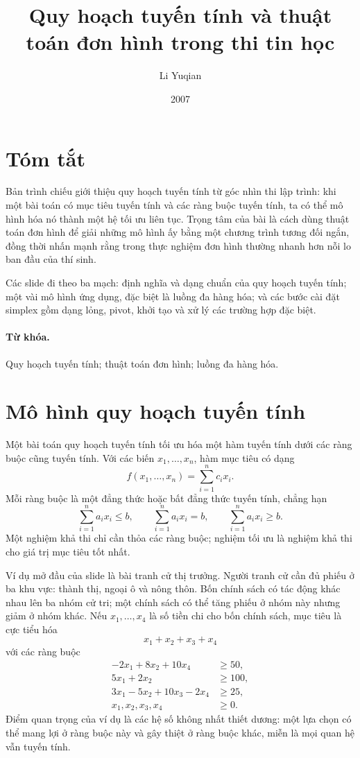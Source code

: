 \documentclass[11pt]{article}
\title{Quy hoạch tuyến tính và thuật toán đơn hình trong thi tin học}
\author{Li Yuqian}
\date{2007}
\begin{document}
\maketitle


\section*{Tóm tắt}

Bản trình chiếu giới thiệu quy hoạch tuyến tính từ góc nhìn thi lập trình:
khi một bài toán có mục tiêu tuyến tính và các ràng buộc tuyến tính, ta có
thể mô hình hóa nó thành một hệ tối ưu liên tục. Trọng tâm của bài là cách
dùng thuật toán đơn hình để giải những mô hình ấy bằng một chương trình tương
đối ngắn, đồng thời nhấn mạnh rằng trong thực nghiệm đơn hình thường nhanh
hơn nỗi lo ban đầu của thí sinh.

Các slide đi theo ba mạch: định nghĩa và dạng chuẩn của quy hoạch tuyến tính;
một vài mô hình ứng dụng, đặc biệt là luồng đa hàng hóa; và các bước cài đặt
simplex gồm dạng lỏng, pivot, khởi tạo và xử lý các trường hợp đặc biệt.

\paragraph{Từ khóa.}
Quy hoạch tuyến tính; thuật toán đơn hình; luồng đa hàng hóa.

\section{Mô hình quy hoạch tuyến tính}

Một bài toán quy hoạch tuyến tính tối ưu hóa một hàm tuyến tính dưới các
ràng buộc cũng tuyến tính. Với các biến \(x_1,\ldots,x_n\), hàm mục tiêu có
dạng
\[
  f(x_1,\ldots,x_n)=\sum_{i=1}^{n} c_ix_i.
\]
Mỗi ràng buộc là một đẳng thức hoặc bất đẳng thức tuyến tính, chẳng hạn
\[
  \sum_{i=1}^{n} a_ix_i\le b,\qquad
  \sum_{i=1}^{n} a_ix_i=b,\qquad
  \sum_{i=1}^{n} a_ix_i\ge b.
\]
Một nghiệm khả thi chỉ cần thỏa các ràng buộc; nghiệm tối ưu là nghiệm khả
thi cho giá trị mục tiêu tốt nhất.

Ví dụ mở đầu của slide là bài tranh cử thị trưởng. Người tranh cử cần đủ
phiếu ở ba khu vực: thành thị, ngoại ô và nông thôn. Bốn chính sách có tác
động khác nhau lên ba nhóm cử tri; một chính sách có thể tăng phiếu ở nhóm
này nhưng giảm ở nhóm khác. Nếu \(x_1,\ldots,x_4\) là số tiền chi cho bốn
chính sách, mục tiêu là cực tiểu hóa
\[
  x_1+x_2+x_3+x_4
\]
với các ràng buộc
\[
\begin{aligned}
-2x_1+8x_2+10x_4 &\ge 50,\\
 5x_1+2x_2      &\ge 100,\\
 3x_1-5x_2+10x_3-2x_4 &\ge 25,\\
 x_1,x_2,x_3,x_4 &\ge 0.
\end{aligned}
\]
Điểm quan trọng của ví dụ là các hệ số không nhất thiết dương: một lựa chọn
có thể mang lợi ở ràng buộc này và gây thiệt ở ràng buộc khác, miễn là mọi
quan hệ vẫn tuyến tính.
\end{document}
